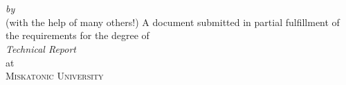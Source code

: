 \begin{titlepage}
  \vspace*{5cm}
  \makeatletter
  \begin{center}
    \begin{Huge}
      \@title
    \end{Huge}\\[0.1cm]
    \begin{Large}
      \@subtitle
    \end{Large}\\
    \emph{by}\\
    \@author\space(with the help of many others!)
    \vfill
    A document submitted in partial fulfillment
    of the requirements for the degree of\\
    \emph{Technical Report}\\
    at\\
    \textsc{Miskatonic University}
  \end{center}
  \makeatother
\end{titlepage}

\newpage
\null
\thispagestyle{empty}
\newpage
